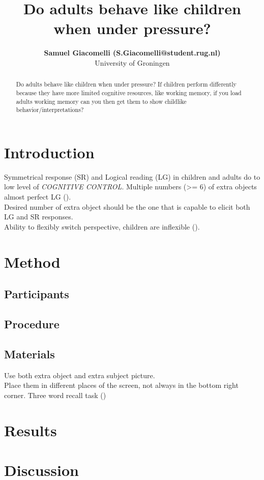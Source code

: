 \documentclass[10pt, a4]{article}
\title{Do adults behave like children when under pressure?}
\author{{\large \bf Samuel Giacomelli (S.Giacomelli@student.rug.nl)} \\
University of Groningen}
\begin{document}
\maketitle

\begin{abstract}
    Do adults behave like children when under pressure? If children perform
    differently because they have more limited cognitive resources, like working
    memory, if you load adults working memory can you then get them to show childlike
    behavior/interpretations?   
\end{abstract}

\section{Introduction}
Symmetrical response (SR) and Logical reading (LG) in children and adults do to low level of \textit{COGNITIVE CONTROL}.
Multiple numbers (>= 6) of extra objects almost perfect LG (\cite{sugisaki2001quantification}).\\
Desired number of extra object should be the one that is capable to elicit both LG and SR responses.\\
Ability to flexibly switch perspective, children are inflexible (\cite{piaget1954language}).\\


\section{Method}

\subsection{Participants}
\blindtext

\subsection{Procedure}
\blindtext

\subsection{Materials}
Use both extra object and extra subject picture.\\
Place them in different places of the screen, not always in the bottom right corner. 
Three word recall task (\cite{cullum1993three})

\blindtext

\section{Results}
\blindtext


\section{Discussion}
\blindtext




\setlength{\bibhang}{.125in}
\setlength{\bibindent}{-\bibhang}

\vfill
\pagebreak


\end{document}
